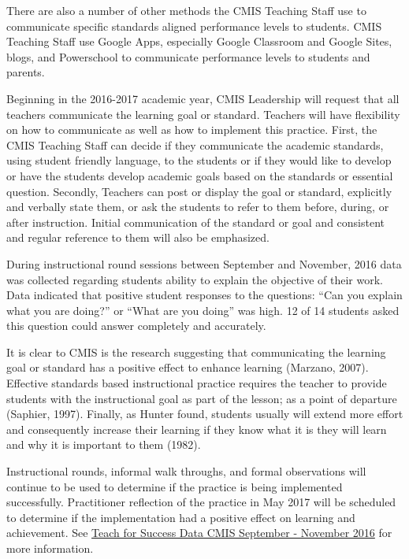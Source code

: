 \begin{findings}
There are also a number of other methods the CMIS Teaching Staff use to communicate specific standards aligned performance levels to students. CMIS Teaching Staff use Google Apps,  especially Google Classroom and Google Sites, blogs, and Powerschool to communicate performance levels to students and parents.


Beginning in the 2016-2017 academic year, CMIS Leadership will request that all teachers communicate the learning goal or standard. Teachers will have flexibility on how to communicate as well as how to implement this practice. First, the CMIS Teaching Staff can decide if they communicate the academic standards, using student friendly language, to the students or if they would like to develop or have the students develop academic goals  based on the standards or essential  question. Secondly, Teachers can post or display the goal or standard, explicitly and verbally state them, or ask the students to refer to them before, during, or after instruction. Initial communication of the standard or goal and consistent  and regular reference to them will also be emphasized. 

During instructional round sessions between September and November, 2016 data was collected regarding students ability to explain the objective of their work. Data indicated that positive student responses to the questions: “Can you explain what you are doing?” or “What are you doing” was high. 12 of 14 students asked this question could answer completely and accurately. 

It is clear to CMIS is the research suggesting that communicating the learning goal or standard has a positive effect to enhance learning (Marzano, 2007). Effective standards based instructional practice requires the teacher to provide students with the instructional goal as part of the lesson; as a point of departure (Saphier, 1997).  Finally, as Hunter found, students usually will extend more effort and consequently increase their learning if they know what it is they will learn and why it is important to them (1982). 

Instructional rounds, informal walk throughs, and formal observations will continue to be used to determine if the practice is being implemented successfully.  Practitioner reflection of the practice in May 2017 will be scheduled to determine if the implementation had a positive effect on learning and achievement. See \href{https://docs.google.com/a/cmis.ac.th/document/d/1cRvL50iIDvo8s1Gnxoczm82LhSVmEOvCrFksxzHD7ko/edit?usp=sharing}{Teach for Success Data CMIS September - November 2016} for more information. 


\end{findings}
